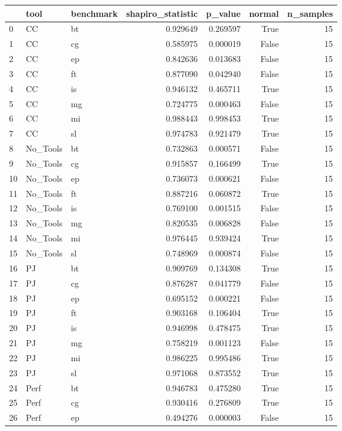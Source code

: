 \begin{tabular}{lllrrrr}
\toprule
 & tool & benchmark & shapiro_statistic & p_value & normal & n_samples \\
\midrule
0 & CC & bt & 0.929649 & 0.269597 & True & 15 \\
1 & CC & cg & 0.585975 & 0.000019 & False & 15 \\
2 & CC & ep & 0.842636 & 0.013683 & False & 15 \\
3 & CC & ft & 0.877090 & 0.042940 & False & 15 \\
4 & CC & is & 0.946132 & 0.465711 & True & 15 \\
5 & CC & mg & 0.724775 & 0.000463 & False & 15 \\
6 & CC & mi & 0.988443 & 0.998453 & True & 15 \\
7 & CC & sl & 0.974783 & 0.921479 & True & 15 \\
8 & No_Tools & bt & 0.732863 & 0.000571 & False & 15 \\
9 & No_Tools & cg & 0.915857 & 0.166499 & True & 15 \\
10 & No_Tools & ep & 0.736073 & 0.000621 & False & 15 \\
11 & No_Tools & ft & 0.887216 & 0.060872 & True & 15 \\
12 & No_Tools & is & 0.769100 & 0.001515 & False & 15 \\
13 & No_Tools & mg & 0.820535 & 0.006828 & False & 15 \\
14 & No_Tools & mi & 0.976445 & 0.939424 & True & 15 \\
15 & No_Tools & sl & 0.748969 & 0.000874 & False & 15 \\
16 & PJ & bt & 0.909769 & 0.134308 & True & 15 \\
17 & PJ & cg & 0.876287 & 0.041779 & False & 15 \\
18 & PJ & ep & 0.695152 & 0.000221 & False & 15 \\
19 & PJ & ft & 0.903168 & 0.106404 & True & 15 \\
20 & PJ & is & 0.946998 & 0.478475 & True & 15 \\
21 & PJ & mg & 0.758219 & 0.001123 & False & 15 \\
22 & PJ & mi & 0.986225 & 0.995486 & True & 15 \\
23 & PJ & sl & 0.971068 & 0.873552 & True & 15 \\
24 & Perf & bt & 0.946783 & 0.475280 & True & 15 \\
25 & Perf & cg & 0.930416 & 0.276809 & True & 15 \\
26 & Perf & ep & 0.494276 & 0.000003 & False & 15 \\

\end{tabular}
